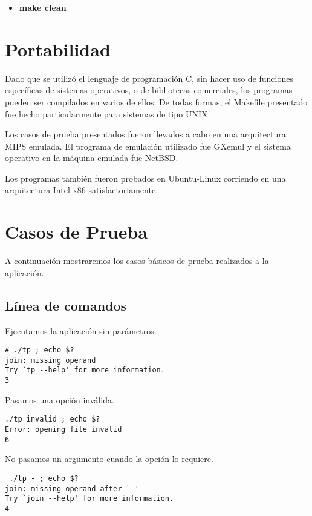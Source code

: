 \documentclass[a4paper, 10pt, twoside, notitlepage]{article}
\begin{document}
\begin{itemize}
 \item[] \textbf{make clean}
\end{itemize}


\section{Portabilidad}

Dado que se utilizó el lenguaje de programación C, sin hacer uso de funciones específicas de sistemas operativos,  o de bibliotecas comerciales, los programas pueden ser compilados en varios de ellos. De todas formas, el Makefile presentado fue hecho particularmente para sistemas de tipo UNIX.

Los casos de prueba presentados fueron llevados a cabo en una arquitectura MIPS emulada. El programa de emulación utilizado fue GXemul y el sistema operativo en la máquina emulada fue NetBSD.

Los programas también fueron probados en Ubuntu-Linux corriendo en una arquitectura Intel x86 satisfactoriamente.


\section{Casos de Prueba}

A continuación mostraremos los casos básicos de prueba realizados a la aplicación.

\subsection{Línea de comandos}

Ejecutamos la aplicación sin parámetros.
\scriptsize
\begin{verbatim}
# ./tp ; echo $?
join: missing operand
Try `tp --help' for more information.
3
\end{verbatim}
\normalsize

Pasamos una opción inválida.
\scriptsize
\begin{verbatim}
./tp invalid ; echo $?
Error: opening file invalid
6
\end{verbatim}
\normalsize

No pasamos un argumento cuando la opción lo requiere.
\scriptsize
\begin{verbatim}
 ./tp - ; echo $?
join: missing operand after `-'
Try `join --help' for more information.
4
\end{verbatim}
\normalsize
\end{document}
